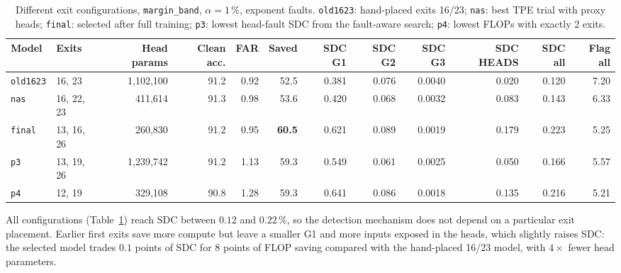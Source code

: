 \documentclass[10pt,a4paper]{article}
\newcommand{\meth}[1]{\texttt{#1}}
\newcommand{\ours}{\meth{margin\_band}}
\begin{document}
\begin{table}[H]
\centering\small
\setlength{\tabcolsep}{3.5pt}
\caption{Different exit configurations, \ours, $\alpha=1\,\%$, exponent faults. \meth{old1623}: hand-placed exits
16/23; \meth{nas}: best TPE trial with proxy heads; \meth{final}: selected after full training;
\meth{p3}: lowest head-fault SDC from the fault-aware search; \meth{p4}: lowest FLOPs with exactly 2 exits.}
\label{tab:models}
\begin{adjustbox}{max width=\linewidth}
\begin{tabular}{@{}llrrrrrrrrrr@{}}
\toprule
Model & Exits & Head params & Clean acc. & FAR & Saved & SDC G1 & SDC G2 & SDC G3 & SDC HEADS & SDC all & Flag all \\
\midrule
\meth{old1623} & 16, 23     & 1{,}102{,}100 & 91.2 & 0.92 & 52.5 & 0.381 & 0.076 & 0.0040 & 0.020 & 0.120 & 7.20 \\
\meth{nas}     & 16, 22, 23 & 411{,}614     & 91.3 & 0.98 & 53.6 & 0.420 & 0.068 & 0.0032 & 0.083 & 0.143 & 6.33 \\
\meth{final}   & 13, 16, 26 & 260{,}830     & 91.2 & 0.95 & \textbf{60.5} & 0.621 & 0.089 & 0.0019 & 0.179 & 0.223 & 5.25 \\
\meth{p3}      & 13, 19, 26 & 1{,}239{,}742 & 91.2 & 1.13 & 59.3 & 0.549 & 0.061 & 0.0025 & 0.050 & 0.166 & 5.57 \\
\meth{p4}      & 12, 19     & 329{,}108     & 90.8 & 1.28 & 59.3 & 0.641 & 0.086 & 0.0018 & 0.135 & 0.216 & 5.21 \\
\bottomrule
\end{tabular}
\end{adjustbox}
\end{table}

All configurations (Table~\ref{tab:models}) reach SDC between $0.12$ and $0.22\,\%$, so the detection
mechanism does not depend on a particular exit placement. Earlier first exits save more compute but leave a
smaller G1 and more inputs exposed in the heads, which slightly raises SDC: the selected model trades
$0.1$ points of SDC for $8$ points of FLOP saving compared with the hand-placed 16/23 model, with $4\times$
fewer head parameters.
\end{document}
